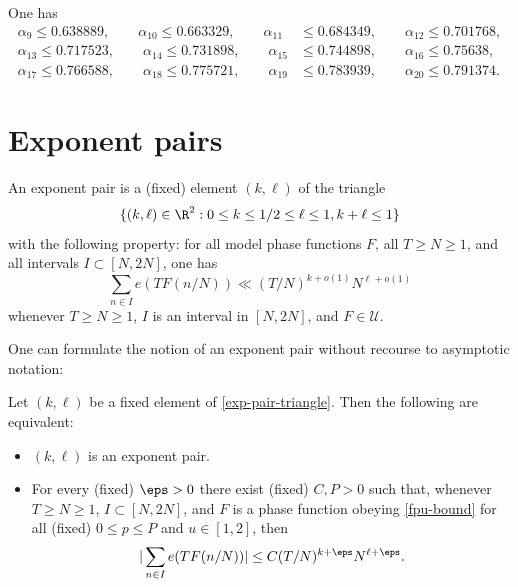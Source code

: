 \begin{theorem}One has
\begin{align*}
\alpha_{9} \le 0.638889,\qquad \alpha_{10} \le 0.663329,\qquad \alpha_{11} &\le 0.684349,\qquad \alpha_{12} \le 0.701768,\\
\alpha_{13} \le 0.717523, \qquad \alpha_{14} \le 0.731898,\qquad \alpha_{15} &\le 0.744898,\qquad \alpha_{16} \le 0.75638,\\
\alpha_{17} \le 0.766588, \qquad \alpha_{18} \le 0.775721,\qquad \alpha_{19} &\le 0.783939,\qquad \alpha_{20} \le 0.791374.
\end{align*}
\end{theorem}


\chapter{Exponent pairs}\label{exponent-pairs-chapter}

\begin{definition}\label{exp-pair-def}  An exponent pair is a (fixed) element $(k,\ell)$ of the triangle
\begin{equation}\label{exp-pair-triangle}
    \{ (k,\ell) \in \R^2: 0 \leq k \leq 1/2 \leq \ell \leq 1, k+\ell \leq 1 \}
\end{equation}
with the following property: for all model phase functions $F$, all $T \geq N \geq 1$, and all intervals $I \subset [N,2N]$, one has
\begin{equation}\label{ntf}
 \sum_{n \in I} e(T F(n/N)) \ll (T/N)^{k+o(1)} N^{\ell+o(1)}
\end{equation}
whenever $T \geq N \geq 1$, $I$ is an interval in $[N,2N]$, and $F \in {\mathcal U}$.
\end{definition}


One can formulate the notion of an exponent pair without recourse to asymptotic notation:

\begin{lemma}  Let $(k,\ell)$ be a fixed element of \eqref{exp-pair-triangle}.  Then the following are equivalent:
    \begin{itemize}
    \item[(i)] $(k,\ell)$ is an exponent pair.
    \item[(ii)] For every (fixed) $\eps>0$ there exist (fixed) $C, P > 0$ such that, whenever $T \geq N \geq 1$, $I \subset [N,2N]$, and $F$ is a phase function obeying \eqref{fpu-bound} for all (fixed) $0 \leq p \leq P$ and $u \in [1,2]$, then
    $$ |\sum_{n \in I} e(T F(n/N))| \leq C (T/N)^{k+\eps} N^{\ell+\eps}.$$
   \end{itemize}
\end{lemma}

